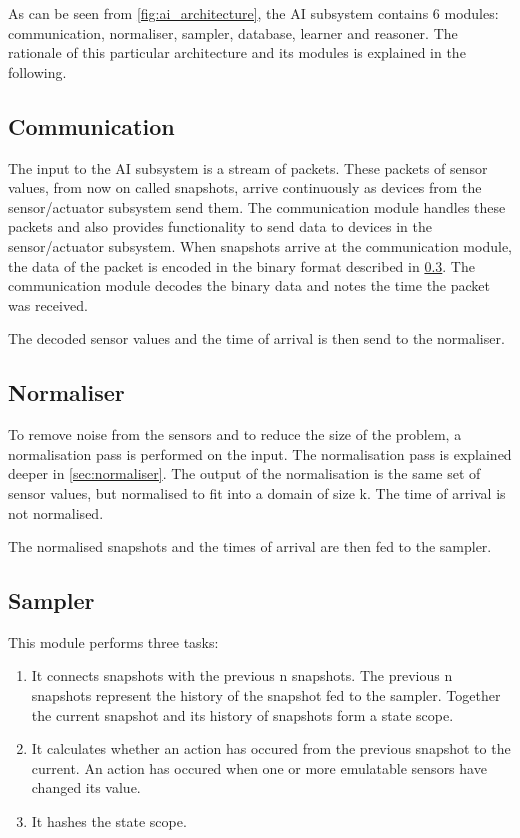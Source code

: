 As can be seen from \cref{fig:ai_architecture}, the AI subsystem contains 6 modules: communication, normaliser, sampler, database, learner and reasoner. The rationale of this particular architecture and its modules is explained in the following.

\subsection{Communication}
The input to the AI subsystem is a stream of packets. These packets of sensor values, from now on called snapshots, arrive continuously as devices from the sensor/actuator subsystem send them. The communication module handles these packets and also provides functionality to send data to devices in the sensor/actuator subsystem. When snapshots arrive at the communication module, the data of the packet is encoded in the binary format described in \cref{}. The communication module decodes the binary data and notes the time the packet was received.

The decoded sensor values and the time of arrival is then send to the normaliser.

\subsection{Normaliser}
To remove noise from the sensors and to reduce the size of the problem, a normalisation pass is performed on the input. The normalisation pass is explained deeper in \cref{sec:normaliser}. The output of the normalisation is the same set of sensor values, but normalised to fit into a domain of size k. The time of arrival is not normalised.

The normalised snapshots and the times of arrival are then fed to the sampler.

\subsection{Sampler}
This module performs three tasks:

\begin{enumerate}
\item It connects snapshots with the previous n snapshots. The previous n snapshots represent the history of the snapshot fed to the sampler. Together the current snapshot and its history of snapshots form a state scope.
\item It calculates whether an action has occured from the previous snapshot to the current. An action has occured when one or more emulatable sensors have changed its value.
\item It hashes the state scope.
\end{enumerate}


